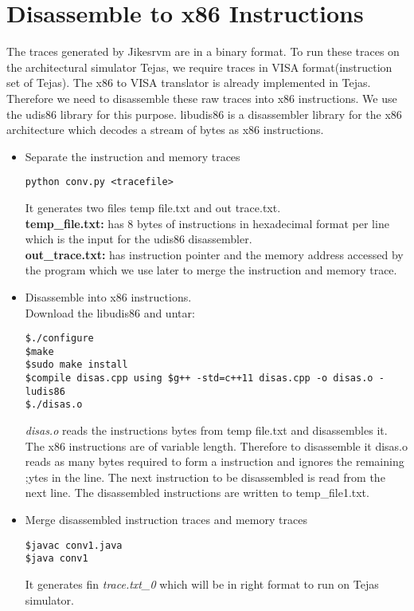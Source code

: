 \documentclass[a4paper]{article}
\begin{document}
\section{Disassemble to x86 Instructions}
The traces generated by Jikesrvm are in a binary format. To run these traces on the architectural simulator Tejas, we require traces in VISA format(instruction set of Tejas). The x86 to VISA translator is already implemented in Tejas. Therefore we need to disassemble these raw traces into x86 instructions. We use the udis86 library for this purpose. libudis86 is a disassembler library for the x86 architecture which decodes a stream of bytes as x86 instructions.
\begin{itemize}
\item Separate the instruction and memory traces
\begin{verbatim}
python conv.py <tracefile>
\end{verbatim}
It generates two files temp file.txt and out trace.txt.\\
\textbf{temp\_file.txt:} has 8 bytes of instructions in hexadecimal format per line which is the input for the udis86 disassembler.\\
\textbf{out\_trace.txt:} has instruction pointer and the memory address accessed by the program which we use later to merge the instruction and memory trace.
\item Disassemble into x86 instructions.\\
Download the libudis86 and untar:
\begin{verbatim}
$./configure
$make
$sudo make install
$compile disas.cpp using $g++ -std=c++11 disas.cpp -o disas.o -ludis86
$./disas.o
\end{verbatim}
\textit{disas.o} reads the instructions bytes from temp file.txt and disassembles it. The x86 instructions are of variable length. Therefore to disassemble it disas.o reads as many
bytes required to form a instruction and ignores the remaining ;ytes in the line. The
next instruction to be disassembled is read from the next line. The disassembled instructions are written to temp\_file1.txt.
\item Merge disassembled instruction traces and memory traces
\begin{verbatim}
$javac conv1.java
$java conv1
\end{verbatim}

It generates fin \textit{trace.txt\_0} which will be in right format to run on Tejas simulator.
\end{itemize}
\end{document}
